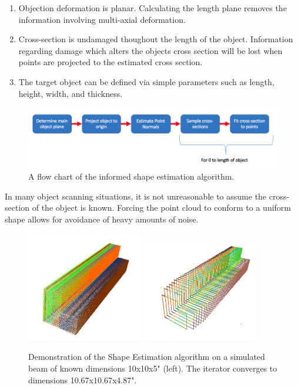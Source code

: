 \documentclass[12pt]{drexelthesis}
\begin{document}
\begin{enumerate}
	\item Objection deformation is planar. Calculating the length plane removes the information involving multi-axial deformation.
	\item Cross-section is undamaged thoughout the length of the object. Information regarding damage which alters the objects cross section will be lost when points are projected to the estimated cross section.
	\item The target object can be defined via simple parameters such as length, height, width, and thickness.
\end{enumerate}

\begin{figure}[!ht]
	\centering
		\includegraphics[width=5in]{cross-section-estimation/flowchart.png}
	\caption[Flow chart of informed shape estimation algorithm]{\centering A flow chart of the informed shape estimation algorithm.}
\end{figure}

In many object scanning situations, it is not unreasonable to assume the cross-section of the object is known. Forcing the point cloud to conform to a uniform shape allows for avoidance of heavy amounts of noise.

\begin{figure}[!ht]
	\centering
		\includegraphics[width=2in]{cross-section-estimation/noiselessbeam(10x10x5).JPG}
		\includegraphics[width=2in]{cross-section-estimation/newtonraphsonconvergence(10x10x5).JPG}
	\caption[Demonstration of the Informed Shape Estimation algorithm on a simulated point cloud.]{\centering Demonstration of the Shape Estimation algorithm on a simulated beam of known dimensions 10x10x5" (left). The iterator converges to dimensions 10.67x10.67x4.87".}
\end{figure}
\end{document}
